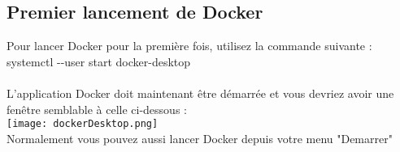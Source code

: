 \documentclass{article}
\begin{document}
    \subsection{Premier lancement de Docker}

    Pour lancer Docker pour la première fois, utilisez la commande suivante :
    \\
    \indent systemctl  {-}{-}user start docker-desktop
    \\
    \\
    L'application Docker doit maintenant être démarrée et vous devriez avoir une fenêtre semblable à celle ci-dessous :
    \\
    \texttt{[image: dockerDesktop.png]}
    \\
    Normalement vous pouvez aussi lancer Docker depuis votre menu "Demarrer"
\end{document}
